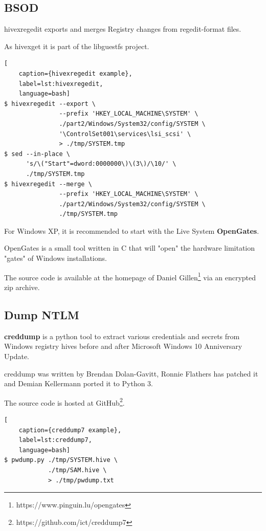\subsection{BSOD}

hivexregedit exports and merges Registry changes from regedit-format files.

As hivexget it is part of the libguestfs project.

\begin{lstlisting}[
    caption={hivexregedit example},
    label=lst:hivexregedit,
    language=bash]
$ hivexregedit --export \
               --prefix 'HKEY_LOCAL_MACHINE\SYSTEM' \
               ./part2/Windows/System32/config/SYSTEM \
               '\ControlSet001\services\lsi_scsi' \
               > ./tmp/SYSTEM.tmp
$ sed --in-place \
      's/\("Start"=dword:0000000\)\(3\)/\10/' \
      ./tmp/SYSTEM.tmp
$ hivexregedit --merge \
               --prefix 'HKEY_LOCAL_MACHINE\SYSTEM' \
               ./part2/Windows/System32/config/SYSTEM \
               ./tmp/SYSTEM.tmp
\end{lstlisting}

For Windows XP, it is recommended to start with the Live System \textbf{OpenGates}.

OpenGates is a small tool written in C that will "open" the hardware limitation "gates" of Windows installations.

The source code is available at the homepage of Daniel Gillen\footnote{https://www.pinguin.lu/opengates} via an encrypted zip archive.

\subsection{Dump NTLM}

\textbf{creddump} is a python tool to extract various credentials and secrets from Windows registry hives before and after Microsoft Windows 10 Anniversary Update.

creddump was written by Brendan Dolan-Gavitt, Ronnie Flathers has patched it and Demian Kellermann ported it to Python 3.

The source code is hosted at GitHub\footnote{https://github.com/ict/creddump7}.

\begin{lstlisting}[
    caption={creddump7 example},
    label=lst:creddump7,
    language=bash]
$ pwdump.py ./tmp/SYSTEM.hive \
            ./tmp/SAM.hive \
            > ./tmp/pwdump.txt
\end{lstlisting}


